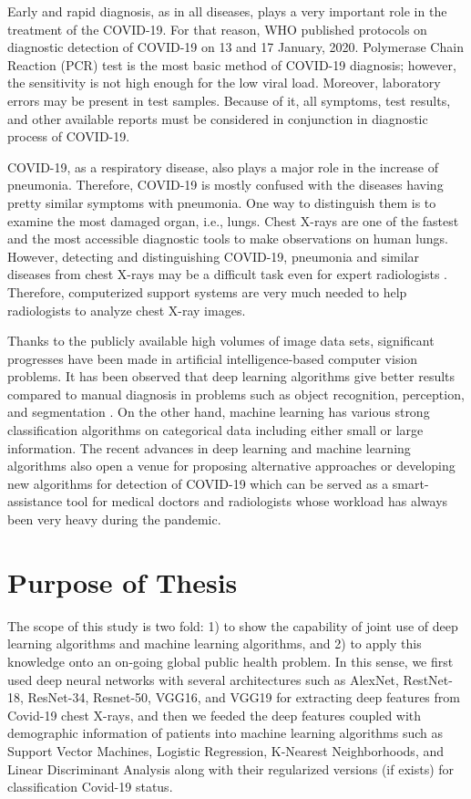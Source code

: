 Early and rapid diagnosis, as in all diseases, plays a very important role in the treatment of the COVID-19. For that reason, WHO published protocols on diagnostic detection of COVID-19 on 13 and 17 January, 2020. Polymerase Chain Reaction (PCR) test \cite{pcr_cleveland_clinic} is the most basic method of COVID-19 diagnosis; however, the sensitivity is not high enough for the low viral load. Moreover, laboratory errors may be present in test samples. Because of it, all symptoms, test results, and other available reports must be considered in conjunction in diagnostic process of COVID-19.

COVID-19, as a respiratory disease, also plays a major role in the increase of pneumonia. Therefore, COVID-19 is mostly confused with the diseases having pretty similar symptoms with pneumonia. One way to distinguish them is to examine the most damaged organ, i.e., lungs. Chest X-rays are one of the fastest and the most accessible diagnostic tools to make observations on human lungs. However, detecting and distinguishing COVID-19, pneumonia and similar diseases from chest X-rays may be a difficult task even for expert radiologists \cite{covid_vs_pneumonia}. Therefore, computerized support systems are very much needed to help radiologists to analyze chest X-ray images. 

Thanks to the publicly available high volumes of image data sets, significant progresses have been made in artificial intelligence-based computer vision problems. It has been observed that deep learning algorithms give better results compared to manual diagnosis in problems such as object recognition, perception, and segmentation \cite{success_of_dl}. On the other hand, machine learning has various strong classification algorithms on categorical data including either small or large information. The recent advances in deep learning and machine learning algorithms also open a venue for proposing alternative approaches or developing new algorithms for detection of COVID-19 which can be served as a smart-assistance tool for medical doctors and radiologists whose workload has always been very heavy during the pandemic.

\section{Purpose of Thesis}\label{purposeofthesis}

The scope of this study is two fold: 1) to show the capability of joint use of deep learning algorithms and machine learning algorithms, and 2) to apply this knowledge onto an on-going global public health problem. In this sense, we first used deep neural networks with several architectures such as AlexNet, RestNet-18, ResNet-34, Resnet-50, VGG16, and VGG19 for extracting deep features from Covid-19 chest X-rays, and then  
we feeded the deep features coupled with demographic information of patients into machine learning algorithms  such as Support Vector Machines, Logistic Regression, K-Nearest Neighborhoods, and Linear Discriminant Analysis along with their regularized versions (if exists) for  classification Covid-19 status.


